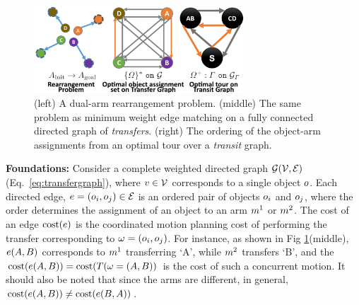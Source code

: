 \begin{figure}
	\begin{center}
		\includegraphics[width=0.7\textwidth]{figures/mapp_labels}
	\end{center}
	\caption{(left) A dual-arm rearrangement problem. (middle) The same problem as minimum weight edge matching on a fully connected directed graph of \textit{transfers}. (right) The ordering of the object-arm assignments from an optimal tour over a \textit{transit} graph.}
	\label{fig:edge_matching}
\end{figure}

\noindent\textbf{Foundations:} Consider a complete weighted directed graph $\mathcal{G}(\mathcal{V},\mathcal{E})$ (Eq.~\ref{eq:transfergraph}), where ${v} \in \mathcal{V}$ corresponds to a single object $ o $. Each directed edge, ${e}=(o_i,o_j) \in \mathcal{E}$ is an ordered pair of objects $ o_i $ and $o_j $, where the order determines the assignment of an object to an arm $ m^1 $ or $ m^2 $. The cost of an edge $ \textup{cost}({e}) $ is the coordinated motion planning cost of performing the transfer corresponding to $ {\omega} = (o_i,o_j) $. For instance, as shown in Fig \ref{fig:edge_matching}(middle), ${e}(A,B)$ corresponds to $ m^1 $ transferring `A', while $ m^2 $ transfers `B', and the $\textup{cost}( {e}(A,B) ) = \textup{cost}(T({\omega}=(A,B))$ is the cost of such a concurrent motion. 
It should also be noted that since the arms are different, in general, $\textup{cost}( {e}(A,B) ) \neq \textup{cost}( {e}(B,A) )$.



